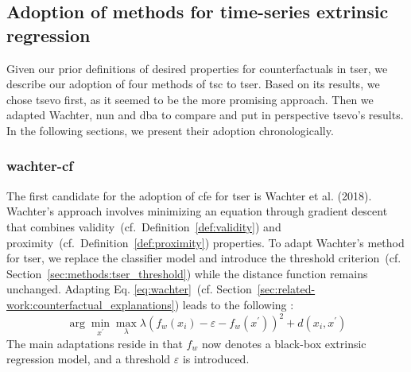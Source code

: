 \subsection{Adoption of methods for time-series extrinsic regression}
\label{sec:methods:tser_adoption}
Given our prior definitions of desired properties for counterfactuals in \gls{tser}, we describe our adoption of four methods of \acrshort{tsc} to \acrshort{tser}. Based on its results, we chose \gls{tsevo} first, as it seemed to be the more promising approach. Then we adapted Wachter, \gls{nun} and \gls{dba} to compare and put in perspective \gls{tsevo}'s results. In the following sections, we present their adoption chronologically.   

\subsubsection{\gls{wachter}-\gls{cf}}
\label{sec:methods:wachter}
The first candidate for the adoption of \gls{cfe} for \gls{tser}  is Wachter et al. \cite{wachter_counterfactual_2018} (2018). Wachter's approach involves minimizing an equation through gradient descent that combines validity~(cf.~Definition~\ref{def:validity}) and proximity~(cf.~Definition~\ref{def:proximity}) properties. To adapt Wachter's method for \gls{tser}, we replace the classifier model and introduce the threshold criterion~(cf. Section~\ref{sec:methods:tser_threshold}) while the distance function remains unchanged.
Adapting Eq. \ref{eq:wachter}~(cf. Section~\ref{sec:related-work:counterfactual_explanations}) leads to the following : 
\begin{equation} \label{eq:wachteR-cf}
\arg \min _{x^{\prime}} \max _{\lambda} \lambda\left(f_{w}\left(x_{i}\right)-\varepsilon -f_{w}\left(x^{\prime}\right)\right)^{2}+d\left(x_{i}, x^{\prime}\right)
\end{equation}
The main adaptations reside in that $f_{w}$ now denotes a black-box extrinsic regression model, and a threshold $\varepsilon$ is introduced. 

